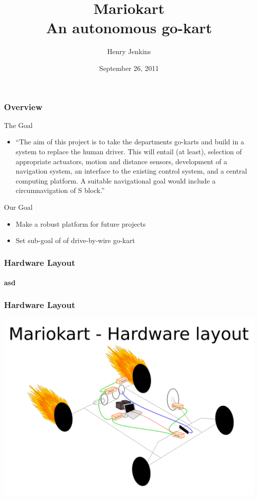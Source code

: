 \documentclass{beamer}
\begin{document}

\begin{frame}
\title{Mariokart \\ An autonomous go-kart}
\author{Henry Jenkins}
\date{September 26, 2011}
\maketitle
\end{frame}

\begin{frame}
\frametitle{Overview}
The Goal
\begin{itemize}
\item ``The aim of this project is to take the departments go-karts and build in a
system to replace the human driver. This will entail (at least), selection of
appropriate actuators, motion and distance sensors, development of a navigation
system, an interface to the existing control system, and a central computing
platform. A suitable navigational goal would include a circumnavigation of S
block.''
\end{itemize}

Our Goal
\begin{itemize}
\item Make a robust platform for future projects
\item Set sub-goal of of drive-by-wire go-kart
\end{itemize}
\end{frame}

\begin{frame}
\frametitle{Hardware Layout}
\framesubtitle{asd}
\end{frame}

\begin{frame}
\frametitle{Hardware Layout}
\includegraphics{../../hardware_layout/layout.png}
\end{frame}
\end{document}
